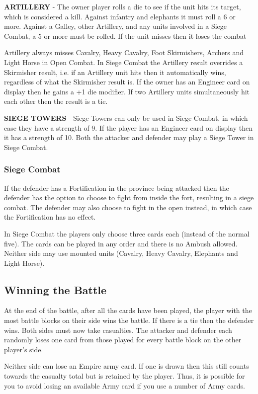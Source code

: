 \textbf{ARTILLERY} - The owner player rolls a die to see if the unit hits its target, which is considered a kill. Against infantry and elephants it must roll a 6 or more. Against a Galley, other Artillery, and any units involved in a Siege Combat, a 5 or more must be rolled. If the unit misses then it loses the combat

Artillery always misses Cavalry, Heavy Cavalry, Foot Skirmishers, Archers and Light Horse in Open Combat. In Siege Combat the Artillery result overrides a Skirmisher result, i.e. if an Artillery unit hits then it automatically wins, regardless of what the Skirmisher result is. If the owner has an Engineer card on display then he gains a +1 die modifier. If two Artillery units simultaneously hit each other then the result is a tie.

\textbf{SIEGE TOWERS} - Siege Towers can only be used in Siege Combat, in which case they have a strength of 9. If the player has an Engineer card on display then it has a strength of 10. Both the attacker and defender may play a Siege Tower in Siege Combat.

\subsubsection{Siege Combat}

If the defender has a Fortification in the province being attacked then the defender has the option to choose to fight from inside the fort, resulting in a siege combat. The defender may also choose to fight in the open instead, in which case the Fortification has no effect.

In Siege Combat the players only choose three cards each (instead of the normal five). The cards can be played in any order and there is no Ambush allowed. Neither side may use mounted units (Cavalry, Heavy Cavalry, Elephants and Light Horse).

\subsection{Winning the Battle}

At the end of the battle, after all the cards have been played, the player with the most battle blocks on their side wins the battle. If there is a tie then the defender wins. Both sides must now take casualties. The attacker and defender each randomly loses one card from those played for every battle block on the other player’s side.

Neither side can lose an Empire army card. If one is drawn then this still counts towards the casualty total but is retained by the player. Thus, it is possible for you to avoid losing an available Army card if you use a number of Army cards.

